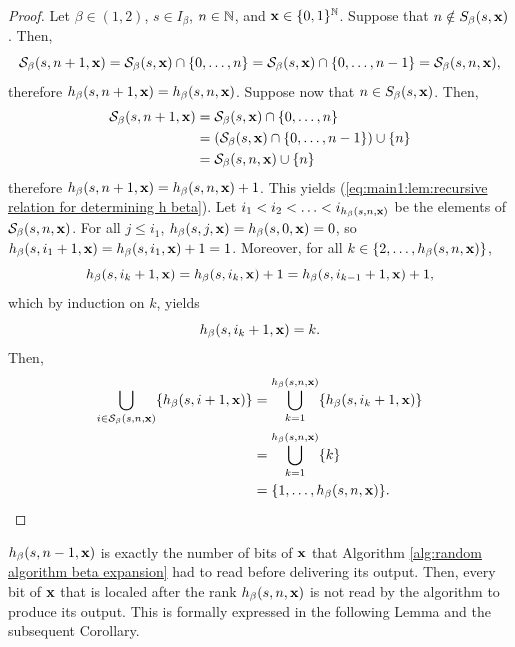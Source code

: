 \begin{proof}
    Let $\beta \in (1,2)$, $s \in I_\beta$, $n \in \mathbb{N}$, and ${\bf x} \in \{0,1\}^{\mathbb{N}}$. Suppose that $n \notin S_\beta(s,{\bf x})$. Then,
    \begin{equation}
        \mathcal{S}_\beta(s,n+1,{\bf x}) = \mathcal{S}_\beta(s,{\bf x}) \cap \{0,\ldots, n\} = \mathcal{S}_\beta(s,{\bf x}) \cap \{0,\ldots, n-1\} = \mathcal{S}_\beta(s,n,{\bf x}),
    \end{equation}
    therefore $h_\beta(s,n+1,{\bf x}) = h_\beta(s,n, {\bf x})$. Suppose now that $n \in S_\beta(s,{\bf x})$. Then,
    \begin{align}
        \mathcal{S}_\beta(s,n+1,{\bf x}) &= \mathcal{S}_\beta(s,{\bf x}) \cap \{0,\ldots, n\}\\
        & = \left(\mathcal{S}_\beta(s,{\bf x}) \cap \{0,\ldots, n-1\}\right) \cup \{n\}\\
        & = \mathcal{S}_\beta(s,n,{\bf x}) \cup \{n\}\,
    \end{align}
    therefore $h_\beta(s,n+1,{\bf x}) = h_\beta(s,n, {\bf x}) + 1$. This yields (\ref{eq:main1:lem:recursive relation for determining h beta}). Let $i_1 < i_2 < \ldots < i_{h_\beta(s,n, {\bf x})}$ be the elements of $\mathcal{S}_\beta(s,n,{\bf x})$. For all $j \leq i_1$, $h_\beta(s, j, {\bf x}) = h_\beta(s, 0, {\bf x}) = 0$, so $h_\beta(s, i_1+1, {\bf x}) = h_\beta(s, i_1, {\bf x}) + 1 = 1$. Moreover, for all $k \in \{2, \ldots, h_\beta(s,n, {\bf x})\}$,
    \begin{equation}
        h_\beta(s, i_k+1, {\bf x}) = h_\beta(s, i_k, {\bf x}) + 1 = h_\beta(s, i_{k-1}+1, {\bf x}) + 1,
    \end{equation}
    which by induction on $k$, yields
    \begin{equation}
        h_\beta(s, i_k+1, {\bf x}) = k.
    \end{equation}
    Then,
    \begin{align}
        \bigcup_{i \in \mathcal{S}_\beta(s,n,{\bf x})} \{h_\beta(s,i+1,{\bf x})\} &= \bigcup_{k = 1}^{h_\beta(s,n,{\bf x})} \{h_\beta(s,i_k+1,{\bf x})\}\\
        & = \bigcup_{k = 1}^{h_\beta(s,n,{\bf x})} \{k\} \\
        &= \{1, \ldots, h_\beta(s,n,{\bf x})\}.
    \end{align}
\end{proof}
\noindent $h_\beta(s,n-1,{\bf x})$ is exactly the number of bits of ${\bf x}$ that Algorithm \ref{alg:random algorithm beta expansion} had to read before delivering its output. Then, every bit of ${\bf x}$ that is localed after the rank $h_\beta(s,n,{\bf x})$ is not read by the algorithm to produce its output. This is formally expressed in the following Lemma and the subsequent Corollary.
